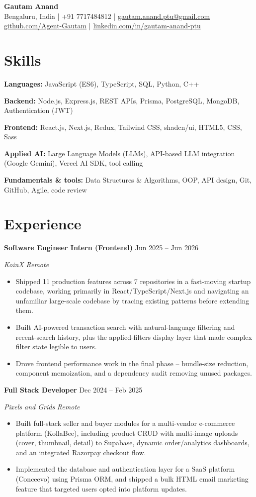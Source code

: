 \documentclass[letterpaper,10.5pt]{article}
\newcommand{\ResumeHeader}[2]{%
  \begin{center}
    {\Huge\bfseries #1}\\[5pt]
    {\small #2}%
  \end{center}\vspace{-6pt}}
\newcommand{\Entry}[4]{%
  \textbf{#1} \hfill {\small #2}\par
  \textit{\small #3} \hfill {\small\textit{#4}}\par\vspace{-1pt}}
\newenvironment{Bullets}
  {\begin{itemize}[leftmargin=1.15em,itemsep=1pt,parsep=0pt,topsep=2pt]\small}
  {\end{itemize}\vspace{3pt}}
\newcommand{\SkillRow}[2]{{\small \textbf{#1:} #2}\par\vspace{1.5pt}}
\begin{document}
\ResumeHeader{Gautam Anand}
  {Bengaluru, India \;|\; +91 7717484812 \;|\;
   \href{mailto:gautam.anand.ptu@gmail.com}{gautam.anand.ptu@gmail.com} \;|\;
   \href{https://github.com/Agent-Gautam}{github.com/Agent-Gautam} \;|\;
   \href{https://www.linkedin.com/in/gautam-anand-ptu}{linkedin.com/in/gautam-anand-ptu}}

\section{Skills}
\SkillRow{Languages}{JavaScript (ES6), TypeScript, SQL, Python, C++}
\SkillRow{Backend}{Node.js, Express.js, REST APIs, Prisma, PostgreSQL, MongoDB, Authentication (JWT)}
\SkillRow{Frontend}{React.js, Next.js, Redux, Tailwind CSS, shadcn/ui, HTML5, CSS, Sass}
\SkillRow{Applied AI}{Large Language Models (LLMs), API-based LLM integration (Google Gemini), Vercel AI SDK, tool calling}
\SkillRow{Fundamentals \& tools}{Data Structures \& Algorithms, OOP, API design, Git, GitHub, Agile, code review}

\section{Experience}
\Entry{Software Engineer Intern (Frontend)}{Jun 2025 -- Jun 2026}{KoinX}{Remote}
\begin{Bullets}
  \item Shipped 11 production features across 7 repositories in a fast-moving startup codebase, working primarily in React/TypeScript/Next.js and navigating an unfamiliar large-scale codebase by tracing existing patterns before extending them.
  \item Built AI-powered transaction search with natural-language filtering and recent-search history, plus the applied-filters display layer that made complex filter state legible to users.
  \item Drove frontend performance work in the final phase -- bundle-size reduction, component memoization, and a dependency audit removing unused packages.
\end{Bullets}

\Entry{Full Stack Developer}{Dec 2024 -- Feb 2025}{Pixels and Grids}{Remote}
\begin{Bullets}
  \item Built full-stack seller and buyer modules for a multi-vendor e-commerce platform (KollaBee), including product CRUD with multi-image uploads (cover, thumbnail, detail) to Supabase, dynamic order/analytics dashboards, and an integrated Razorpay checkout flow.
  \item Implemented the database and authentication layer for a SaaS platform (Conceevo) using Prisma ORM, and shipped a bulk HTML email marketing feature that targeted users opted into platform updates.
\end{Bullets}
\end{document}
